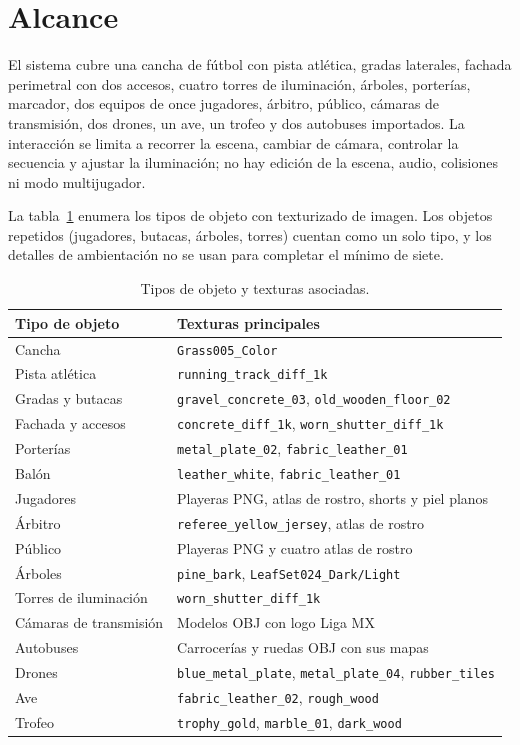 \documentclass[12pt,letterpaper]{article}
\begin{document}
\section{Alcance}
El sistema cubre una cancha de fútbol con pista atlética, gradas laterales, fachada perimetral con
dos accesos, cuatro torres de iluminación, árboles, porterías, marcador, dos equipos de once
jugadores, árbitro, público, cámaras de transmisión, dos drones, un ave, un trofeo y dos autobuses
importados. La interacción se limita a recorrer la escena, cambiar de cámara, controlar la secuencia
y ajustar la iluminación; no hay edición de la escena, audio, colisiones ni modo multijugador.

La tabla~\ref{tab:objetos} enumera los tipos de objeto con texturizado de imagen. Los objetos
repetidos (jugadores, butacas, árboles, torres) cuentan como un solo tipo, y los detalles de
ambientación no se usan para completar el mínimo de siete.

\begin{table}[H]
\centering
\small
\begin{tabular}{p{}p{}}
\toprule
\textbf{Tipo de objeto} & \textbf{Texturas principales}\\
\midrule
Cancha & \texttt{Grass005\_Color}\\
Pista atlética & \texttt{running\_track\_diff\_1k}\\
Gradas y butacas & \texttt{gravel\_concrete\_03}, \texttt{old\_wooden\_floor\_02}\\
Fachada y accesos & \texttt{concrete\_diff\_1k}, \texttt{worn\_shutter\_diff\_1k}\\
Porterías & \texttt{metal\_plate\_02}, \texttt{fabric\_leather\_01}\\
Balón & \texttt{leather\_white}, \texttt{fabric\_leather\_01}\\
Jugadores & Playeras PNG, atlas de rostro, shorts y piel planos\\
Árbitro & \texttt{referee\_yellow\_jersey}, atlas de rostro\\
Público & Playeras PNG y cuatro atlas de rostro\\
Árboles & \texttt{pine\_bark}, \texttt{LeafSet024\_Dark/Light}\\
Torres de iluminación & \texttt{worn\_shutter\_diff\_1k}\\
Cámaras de transmisión & Modelos OBJ con logo Liga MX\\
Autobuses & Carrocerías y ruedas OBJ con sus mapas\\
Drones & \texttt{blue\_metal\_plate}, \texttt{metal\_plate\_04}, \texttt{rubber\_tiles}\\
Ave & \texttt{fabric\_leather\_02}, \texttt{rough\_wood}\\
Trofeo & \texttt{trophy\_gold}, \texttt{marble\_01}, \texttt{dark\_wood}\\
\bottomrule
\end{tabular}
\caption{Tipos de objeto y texturas asociadas.}\label{tab:objetos}
\end{table}
\end{document}
